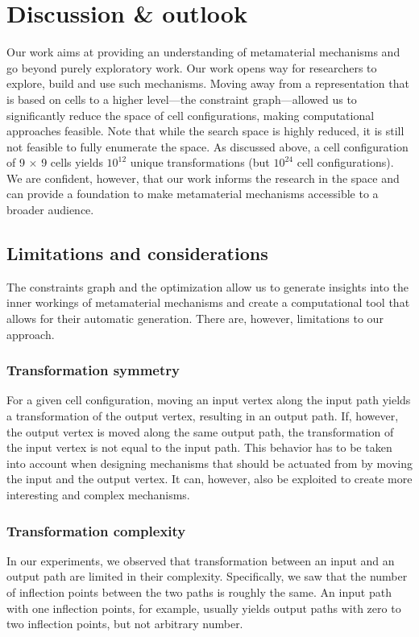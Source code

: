 \section{Discussion \& outlook}

Our work aims at providing an understanding of metamaterial mechanisms and go beyond purely exploratory work. Our work opens way for researchers to explore, build and use such mechanisms. Moving away from a representation that is based on cells to a higher level---the constraint graph---allowed us to significantly reduce the space of cell configurations, making computational approaches feasible. Note that while the search space is highly reduced, it is still not feasible to fully enumerate the space. As discussed above, a cell configuration of 9 $\times$ 9 cells yields $10^12$ unique transformations (but $10^24$ cell configurations). We are confident, however, that our work informs the research in the space and can provide a foundation to make metamaterial mechanisms accessible to a broader audience. 


\subsection{Limitations and considerations}

The constraints graph and the optimization allow us to generate insights into the inner workings of metamaterial mechanisms and create a computational tool that allows for their automatic generation. There are, however, limitations to our approach.

\subsubsection{Transformation symmetry}
For a given cell configuration, moving an input vertex along the input path yields a transformation of the output vertex, resulting in an output path. If, however, the output vertex is moved along the same output path, the transformation of the input vertex is not equal to the input path. This behavior has to be taken into account when designing mechanisms that should be actuated from by moving the input and the output vertex. It can, however, also be exploited to create more interesting and complex mechanisms.

\subsubsection{Transformation complexity}
In our experiments, we observed that transformation between an input and an output path are limited in their complexity. Specifically, we saw that the number of inflection points between the two paths is roughly the same. An input path with one inflection points, for example, usually yields output paths with zero to two inflection points, but not arbitrary number. 

